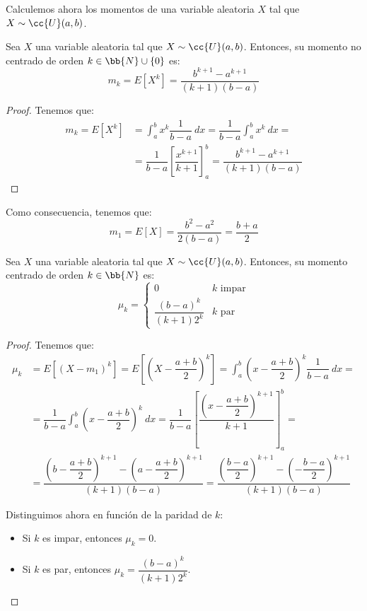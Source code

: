 Calculemos ahora los momentos de una variable aleatoria $X$ tal que $X\sim \cc{U}(a,b)$.
\begin{prop}
    Sea $X$ una variable aleatoria tal que $X\sim \cc{U}(a,b)$. Entonces, su momento no centrado de orden $k\in \bb{N}\cup \{0\}$ es:
    \begin{equation*}
        m_k = E[X^k] = \dfrac{b^{k+1} - a^{k+1}}{(k+1)(b-a)}
    \end{equation*}
\end{prop}
\begin{proof}
    Tenemos que:
    \begin{align*}
        m_k = E[X^k] &= \int_{a}^{b} x^k \dfrac{1}{b-a}~dx = \dfrac{1}{b-a} \int_{a}^{b} x^k~dx =\\
        &= \dfrac{1}{b-a} \left[ \dfrac{x^{k+1}}{k+1} \right]_{a}^{b} = \dfrac{b^{k+1} - a^{k+1}}{(k+1)(b-a)}
    \end{align*}
\end{proof}

Como consecuencia, tenemos que:
\begin{equation*}
    m_1 = E[X] = \dfrac{b^2 - a^2}{2(b-a)} = \dfrac{b+a}{2}
\end{equation*}

\begin{prop}
    Sea $X$ una variable aleatoria tal que $X\sim \cc{U}(a,b)$. Entonces, su momento centrado de orden $k\in \bb{N}$ es:
    \begin{equation*}
        \mu_k = \begin{cases}
            0 & k \text{ impar}\\
            \dfrac{(b-a)^k}{(k+1)2^k} & k \text{ par}
        \end{cases}
    \end{equation*}
\end{prop}
\begin{proof}
    Tenemos que:
    \begin{align*}
        \mu_k &= E[(X-m_1)^k] = E\left[\left(X-\dfrac{a+b}{2}\right)^k\right] = \int_{a}^{b} \left(x-\dfrac{a+b}{2}\right)^k \dfrac{1}{b-a}~dx =\\
        &= \dfrac{1}{b-a} \int_{a}^{b} \left(x-\dfrac{a+b}{2}\right)^k~dx
        = \dfrac{1}{b-a} \left[ \dfrac{\left(x-\dfrac{a+b}{2}\right)^{k+1}}{k+1} \right]_{a}^{b}
        =\\&= \dfrac{\left(b-\dfrac{a+b}{2}\right)^{k+1} - \left(a-\dfrac{a+b}{2}\right)^{k+1}}{(k+1)(b-a)}
        = \dfrac{\left(\dfrac{b-a}{2}\right)^{k+1} - \left(-\dfrac{b-a}{2}\right)^{k+1}}{(k+1)(b-a)}
    \end{align*}

    Distinguimos ahora en función de la paridad de $k$:
    \begin{itemize}
        \item Si $k$ es impar, entonces $\mu_k = 0$.
        \item Si $k$ es par, entonces $\mu_k = \dfrac{(b-a)^k}{(k+1)2^k}$.
    \end{itemize}
\end{proof}


